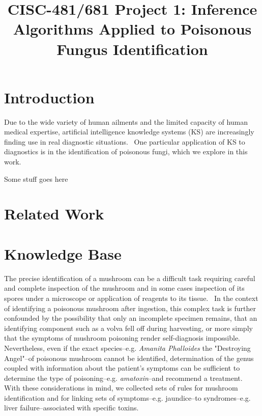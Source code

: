 \documentclass[12pt, conference, compsocconf]{IEEEtran}
\begin{document}
\title{CISC-481/681 Project 1: Inference Algorithms Applied to Poisonous Fungus Identification}

\author{ }

\maketitle

\section{Introduction}
Due to the wide variety of human ailments and the limited capacity of human medical expertise, artificial intelligence knowledge systems (KS) are increasingly finding use in real diagnostic situations.~\cite{expert-systems-in-diagnosis}
One particular application of KS to diagnostics is in the identification of poisonous fungi, which we explore in this work. 



Some stuff goes here ~\cite{russell-norvig-aima} ~\cite{python-doc} ~\cite{sympy-doc}

\section{Related Work}

\section{Knowledge Base}
The precise identification of a mushroom can be a difficult task requiring careful and complete inspection of the mushroom and in some cases inspection of its spores under a microscope or application of reagents to its tissue.~\cite{handbook-mushroom-poison}
In the context of identifying a poisonous mushroom after ingestion, this complex task is further confounded by the possibility that only an incomplete specimen remains, that an identifying component such as a volva fell off during harvesting, or more simply that the symptoms of mushroom poisoning render self-diagnosis impossible. 
Nevertheless, even if the exact species--e.g. \emph{Amanita Phalloides} the "Destroying Angel"--of poisonous mushroom cannot be identified, determination of the genus coupled with information about the patient's symptoms can be sufficient to determine the type of poisoning--e.g. \emph{amatoxin}--and recommend a treatment. 
With these considerations in mind, we collected sets of rules for mushroom identification and for linking sets of symptoms--e.g. jaundice--to syndromes--e.g. liver failure--associated with specific toxins. 
\end{document}
